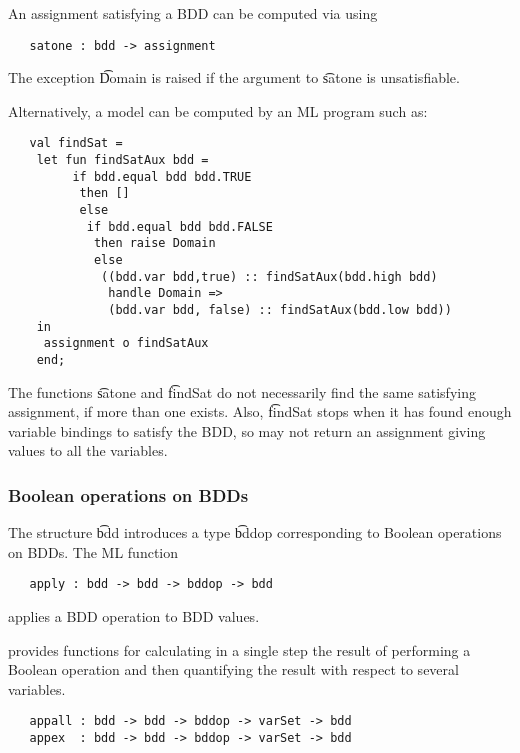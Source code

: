 An assignment satisfying a BDD can be computed via \Buddy{} using

\begin{verbatim}
   satone : bdd -> assignment
\end{verbatim}

The exception \t{Domain} is raised if the argument to \t{satone} is unsatisfiable.

Alternatively, a model can be computed by an ML program such as:

\begin{verbatim}
   val findSat =
    let fun findSatAux bdd = 
         if bdd.equal bdd bdd.TRUE
          then []
          else
           if bdd.equal bdd bdd.FALSE
            then raise Domain
            else
             ((bdd.var bdd,true) :: findSatAux(bdd.high bdd) 
              handle Domain =>
              (bdd.var bdd, false) :: findSatAux(bdd.low bdd))
    in
     assignment o findSatAux
    end;
\end{verbatim}

The functions \t{satone} and \t{findSat} do not necessarily find the
same satisfying assignment, if more than one exists. Also,
\t{findSat} stops when it has found enough variable bindings to
satisfy the BDD, so may not return an assignment giving values to all
the variables.

\subsubsection{Boolean operations on BDDs}\label{app}

The structure \t{bdd} introduces a type \t{bddop}
corresponding to Boolean operations on BDDs. 
The ML function

\begin{verbatim}
   apply : bdd -> bdd -> bddop -> bdd
\end{verbatim}

applies a BDD operation to BDD values.

\Buddy{} provides functions for calculating in a single step the
result of performing a Boolean operation and then quantifying the
result with respect to several variables.

\begin{verbatim}
   appall : bdd -> bdd -> bddop -> varSet -> bdd
   appex  : bdd -> bdd -> bddop -> varSet -> bdd
\end{verbatim}

